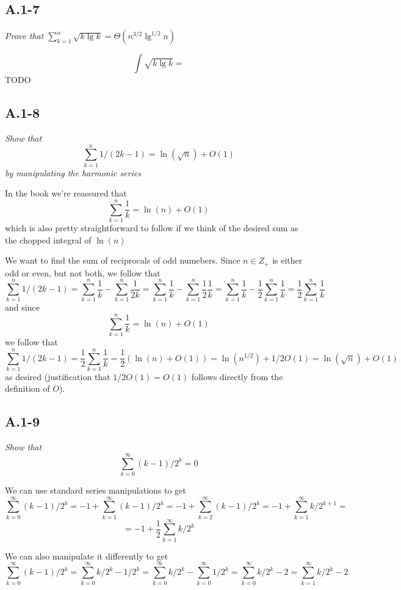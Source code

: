 \documentclass[11pt,oneside,titlepage]{book}
\begin{document}
\subsection*{A.1-7}
\textit{Prove that $\sum_{k = 1}^n{\sqrt{k \lg k}} = \Theta(n^{3/2}\lg^{1/2}n)$}

$$\int \sqrt{k \lg k} = $$
TODO

\subsection*{A.1-8}
\textit{Show that
  $$\sum_{k = 1}^{n}{1/(2k - 1)} = \ln(\sqrt{n}) + O(1)$$
  by manipulating the harmonic series
}

In the book we're reassured that
$$\sum_{k = 1}^n{\frac{1}{k}} = \ln(n) + O(1)$$
which is also pretty straightforward to follow if we think of the desired sum as the
chopped integral of $\ln(n)$

We want to find the sum of reciprocals of odd numebers. Since $n \in Z_+$ is
either odd or even, but not both, we follow that
$$\sum_{k = 1}^{n}{1/(2k - 1)} = \sum_{k = 1}^n{\frac{1}{k}} -
\sum_{k = 1}^{n}{\frac{1}{2k}} =
\sum_{k = 1}^n{\frac{1}{k}} - \sum_{k = 1}^{n}{\frac{1}{2} \frac{1}{k}} =
\sum_{k = 1}^n{\frac{1}{k}} - \frac{1}{2}\sum_{k = 1}^{n}{\frac{1}{k}} =
\frac{1}{2}\sum_{k = 1}^{n}{\frac{1}{k}} $$
and since
$$\sum_{k = 1}^n{\frac{1}{k}} = \ln(n) + O(1)$$
we follow that
$$\sum_{k = 1}^{n}{1/(2k - 1)} = \frac{1}{2}\sum_{k = 1}^{n}{\frac{1}{k}}  =
\frac{1}{2}(\ln(n) + O(1)) = \ln(n^{1/2}) + 1/2 O(1) =
\ln(\sqrt{n}) + O(1) $$
as desired (justification that $1/2 O(1) = O(1)$ follows directly from the
definition of $O$).

\subsection*{A.1-9}
\textit{Show that}
$$\sum_{k = 0}^{\infty}{(k - 1)/2^k} = 0$$

We can use standard series manipulations to get
$$\sum_{k = 0}^\infty{(k - 1) / 2^k} = -1 + \sum_{k = 1}^\infty{(k - 1) / 2^k} =
-1 + \sum_{k = 2}^\infty{(k - 1) / 2^k} = -1 + \sum_{k = 1}^\infty{k / 2^{k + 1}} = $$
$$ = -1 + \frac{1}{2} \sum_{k = 1}^\infty{k / 2^{k}}$$

We can also manipulate it differently to get
$$\sum_{k = 0}^\infty{(k - 1) / 2^k} = \sum_{k = 0}^\infty{k/ 2^k - 1/2^k} =
\sum_{k = 0}^\infty{k/ 2^k} -  \sum_{k = 0}^\infty{1/2^k} =
\sum_{k = 0}^\infty{k/ 2^k} - 2 =  \sum_{k = 1}^\infty{k/ 2^k} - 2$$
\end{document}
